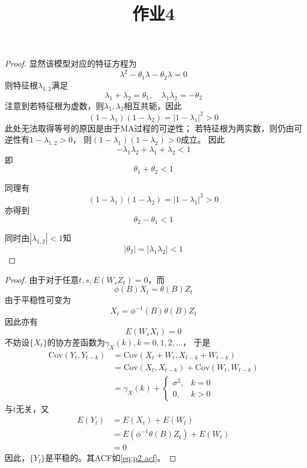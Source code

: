 \documentclass[cn]{homework}
\title{作业4}
\begin{document}
    \maketitle

    \problem
    \begin{proof}
        显然该模型对应的特征方程为
        \[\lambda^2-\theta_1\lambda-\theta_2\lambda=0\]
        则特征根$\lambda_{1,2}$满足
        \[\lambda_1+\lambda_2=\theta_1,
        \quad\lambda_1\lambda_2=-\theta_2\]
        注意到若特征根为虚数，则$\lambda_1,\lambda_2$相互共轭，因此
        \[(1-\lambda_1)(1-\lambda_2)=|1-\lambda_1|^2>0\]
        此处无法取得等号的原因是由于MA过程的可逆性；
        若特征根为两实数，则仍由可逆性有$1-\lambda_{1,2}>0$，
        则$(1-\lambda_1)(1-\lambda_2)>0$成立。
        因此
        \[-\lambda_1\lambda_2+\lambda_1+\lambda_2<1\]
        即
        \[\theta_1+\theta_2<1\]
        
        同理有
        \[(1-\lambda_1)(1-\lambda_2)=|1-\lambda_1|^2>0\]
        亦得到
        \[\theta_2-\theta_1<1\]

        同时由$|\lambda_{1,2}|<1$知
        \[|\theta_2|=|\lambda_1\lambda_2|<1\]
    \end{proof}

    \problem
    \newcommand{\Cov}{\mathrm{Cov}}
    \newcommand{\Var}{\mathrm{Var}}
    \begin{proof}
        由于对于任意$t,s,E(W_sZ_t)=0$，而
        \[\phi(B)X_t=\theta(B)Z_t\]
        由于平稳性可变为
        \[X_t=\phi^{-1}(B)\theta(B)Z_t\]
        因此亦有
        \[E(W_sX_t)=0\]
        不妨设$\{X_t\}$的协方差函数为$\gamma_X(k),k=0,1,2,\ldots$，
        于是
        \begin{equation}\begin{aligned}
            \label{eq:p2 acf}
            \Cov(Y_t,Y_{t-k})&=\Cov(X_t+W_t,X_{t-k}+W_{t-k})\\
            &=\Cov(X_t,X_{t-k})+\Cov(W_t,W_{t-k})\\
            &=\gamma_X(k)+\begin{cases}
                \sigma^2,&k=0\\
                0,&k>0
            \end{cases}
        \end{aligned}\end{equation}
        与$t$无关，又
        \[\begin{aligned}
            E(Y_t)&=E(X_t)+E(W_t)\\
            &=E(\phi^{-1}\theta(B)Z_t)+E(W_t)\\
            &=0
        \end{aligned}\]
        因此，$\{Y_t\}$是平稳的。其ACF如\cref{eq:p2 acf}。
    \end{proof}
\end{document}
